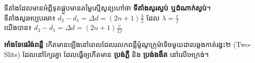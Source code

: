 ទីតាំងដែលមានអំព្លីទុតផ្កួបមានតម្លៃស្មើសូន្យហៅថា \textbf{\textcolor{bacpink}{ទីតាំងសូរស្ងប់ ឬដំណាក់ស្ងប់}}។\\
ទីតាំងសូរអប្បបរមា៖
$d_2-d_1=\Delta d =(2n+1)\frac{\lambda}{2}$ ដែល $\lambda=\frac{v}{f}$\\
យើងបាន៖
$\boxed{d_2-d_1=\Delta d = (2n+1)\frac{v}{2f}}$


\textbf{អាំងទែផេរ៉ង់ពន្លឺ}
កើតមានឡើងនៅពេលដែលរលកពន្លឺម៉ូណូក្រូម៉ាទិចមួយដាលឆ្លងកាត់រង្វះ២ ({\englishfont Two-Slits}) ដែលនៅក្បែរគ្នា ដែលធ្វើឲ្យកើតមាន \textbf{ប្រង់ភ្លឺ} និង \textbf{ប្រង់ងងឹត} នៅលើអេក្រង់។\\

